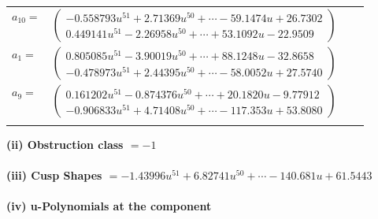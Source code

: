 \documentclass[1p]{elsarticle_modified}
\theoremstyle{definition}
\begin{document}
\begin{tabular}{m{7pt} m{180pt} m{7pt} m{180pt} }
\flushright $a_{10}=$&$\begin{pmatrix}-0.558793 u^{51}+2.71369 u^{50}+\cdots-59.1474 u+26.7302\\0.449141 u^{51}-2.26958 u^{50}+\cdots+53.1092 u-22.9509\end{pmatrix}$ \\
\flushright $a_{1}=$&$\begin{pmatrix}0.805085 u^{51}-3.90019 u^{50}+\cdots+88.1248 u-32.8658\\-0.478973 u^{51}+2.44395 u^{50}+\cdots-58.0052 u+27.5740\end{pmatrix}$ \\
\flushright $a_{9}=$&$\begin{pmatrix}0.161202 u^{51}-0.874376 u^{50}+\cdots+20.1820 u-9.77912\\-0.906833 u^{51}+4.71408 u^{50}+\cdots-117.353 u+53.8080\end{pmatrix}$\\&\end{tabular}
\flushleft \textbf{(ii) Obstruction class $= -1$}\\~\\
\flushleft \textbf{(iii) Cusp Shapes $= -1.43996 u^{51}+6.82741 u^{50}+\cdots-140.681 u+61.5443$}\\~\\
\newpage\renewcommand{\arraystretch}{1}
\flushleft \textbf{(iv) u-Polynomials at the component}\newline \\
\end{document}
